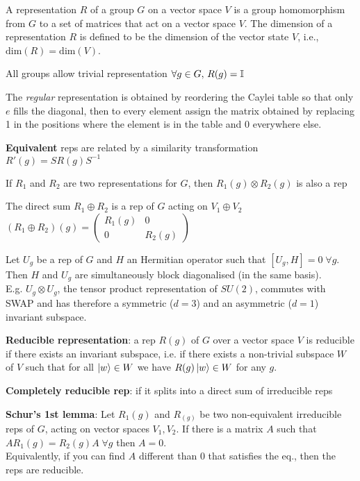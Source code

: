 \begin{squishlist}
    \item A representation $R$ of a group $G$ on a vector space
    $V$ is a group homomorphism from $G$ to a set of matrices that act on a vector space $V$.
    The dimension of a representation $R$ is defined to be the dimension of the vector state $V$, i.e.,
    $\text{dim}(R)=\text{dim}(V)$.
    \item All groups allow trivial representation $\forall g \in G, \, R(g) = \mathbb{I}$
    \item The \emph{regular} representation is obtained by reordering the Caylei table so that only $e$ fills the diagonal, then to every element assign the matrix obtained by replacing 1 in the positions where the element is in the table and 0 everywhere else.
    \item \textbf{Equivalent} reps are related by a similarity transformation $R'(g) = S R(g) S^{-1}$
    \item If $R_1$ and $R_2$ are two representations for $G$, then $R_1(g) \otimes R_2(g)$ is also a rep
    \item The direct sum $R_1 \oplus R_2$ is a rep of $G$ acting on $V_1 \oplus V_2$ \\
    $(R_1 \oplus R_2)(g) = \begin{pmatrix} R_1(g) & 0 \\ 0 & R_2(g) \end{pmatrix}$

    \item Let $U_g$ be a rep of $G$ and $H$ an Hermitian operator such that $[U_g,H] = 0 \; \forall g$. Then $H$ and $U_g$ are simultaneously block diagonalised (in the same basis). \\
    E.g. $U_g \otimes U_g$, the tensor product representation of $SU(2)$, commutes with SWAP and has therefore a symmetric ($d=3$) and an asymmetric ($d=1$) invariant subspace.
    \item \textbf{Reducible representation}: a rep $R(g)$ of $G$ over a vector space $V$ is reducible if there exists an invariant subspace, i.e. if there exists a non-trivial subspace $W$ of $V$ such that for all $\ket{w} \in W$ we have $R(g) \ket{w} \in W$ for any $g$.
    \item \textbf{Completely reducible rep}: if it splits into a direct sum of irreducible reps
    
    \item \textbf{Schur's 1st lemma}: Let $R_1(g)$ and $R_(g)$ be two non-equivalent irreducible reps of $G$, acting on vector spaces $V_1, V_2$. If there is a matrix $A$ such that \\ $A R_1(g) = R_2(g) A \; \forall g$ \quad then $A=0$.\\
    Equivalently, if you can find $A$ different than 0 that satisfies the eq., then the reps are reducible.


\end{squishlist}
